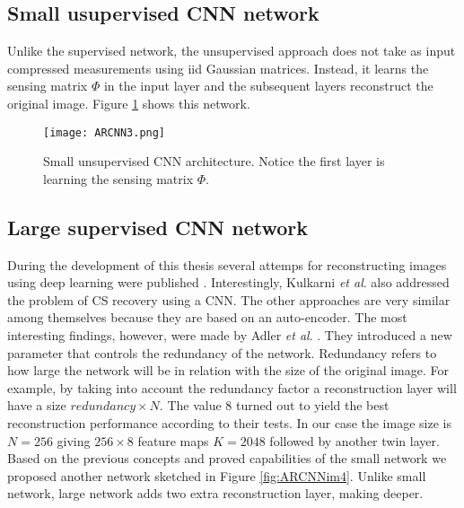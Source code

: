 \FloatBarrier

\subsection{Small usupervised CNN network} \label{ch:alphaNet}
Unlike the supervised network, the unsupervised approach does not take as input compressed measurements using iid Gaussian matrices. Instead, it learns the sensing matrix $\Phi$ in the input layer and the subsequent layers reconstruct the original image. Figure \ref{fig:ARCNNim3} shows this network.
\begin{figure}[!htb]
\centering 
\texttt{[image: ARCNN3.png]} 
\caption[Small unsupervised CNN architecture for recovery ]{Small unsupervised CNN architecture. Notice the first layer is learning the sensing matrix $\Phi$.}
\label{fig:ARCNNim3} 
\end{figure}

\FloatBarrier

\subsection{Large supervised CNN network} \label{ch:betaNet}
During the development of this thesis several attemps for reconstructing images using deep learning were published \cite{kulkarni2016reconnet,mousavi2015deep,iliadis2016deep,iliadis2016deepbinarymask,adler2016deep}. Interestingly, Kulkarni \textit{et al}. \cite{kulkarni2016reconnet} also addressed the problem of CS recovery using a CNN. The other approaches are very similar among themselves because they are based on an auto-encoder. The most interesting findings, however, were made by Adler \textit{et al}. \cite{adler2016deep}. They introduced a new parameter that controls the redundancy of the network. Redundancy refers to how large the network will be in relation with the size of the original image. For example, by taking into account the redundancy factor a reconstruction layer will have a size $redundancy \times N$. The value 8 turned out to yield the best reconstruction performance according to their tests. In our case the image size is $N=256$ giving $256 \times 8 $ feature maps $K = 2048$ followed by another twin layer. 
\newline
Based on the previous concepts and proved capabilities of the small network we proposed another network sketched in Figure \ref{fig:ARCNNim4}. Unlike small network, large network adds two extra reconstruction layer, making deeper. 
       
